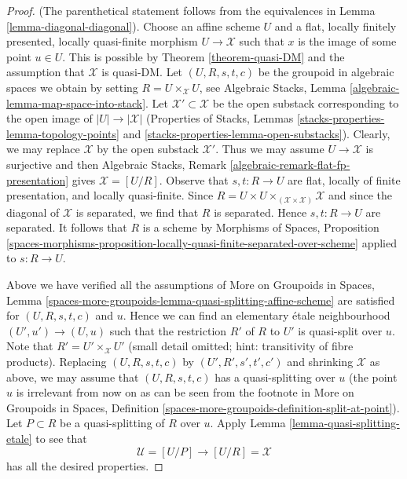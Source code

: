 \begin{proof}
(The parenthetical statement follows from the equivalences in
Lemma \ref{lemma-diagonal-diagonal}).
Choose an affine scheme $U$ and a flat, locally finitely presented,
locally quasi-finite morphism $U \to \mathcal{X}$ such that $x$
is the image of some point $u \in U$. This is possible by
Theorem \ref{theorem-quasi-DM} and the assumption that $\mathcal{X}$
is quasi-DM. Let $(U, R, s, t, c)$ be the groupoid in algebraic spaces
we obtain by setting $R = U \times_\mathcal{X} U$, see
Algebraic Stacks, Lemma \ref{algebraic-lemma-map-space-into-stack}.
Let $\mathcal{X}' \subset \mathcal{X}$ be the open substack corresponding
to the open image of $|U| \to |\mathcal{X}|$
(Properties of Stacks, Lemmas
\ref{stacks-properties-lemma-topology-points} and
\ref{stacks-properties-lemma-open-substacks}).
Clearly, we may replace $\mathcal{X}$ by the open substack $\mathcal{X}'$.
Thus we may assume $U \to \mathcal{X}$ is surjective and then
Algebraic Stacks, Remark \ref{algebraic-remark-flat-fp-presentation}
gives $\mathcal{X} = [U/R]$.
Observe that $s, t : R \to U$ are flat, locally of finite presentation,
and locally quasi-finite.
Since $R = U \times U \times_{(\mathcal{X} \times \mathcal{X})} \mathcal{X}$
and since the diagonal of $\mathcal{X}$ is separated, we find that
$R$ is separated. Hence $s, t : R \to U$ are separated. It follows
that $R$ is a scheme by
Morphisms of Spaces, Proposition
\ref{spaces-morphisms-proposition-locally-quasi-finite-separated-over-scheme}
applied to $s : R \to U$.

\medskip\noindent
Above we have verified all the assumptions of
More on Groupoids in Spaces, Lemma
\ref{spaces-more-groupoids-lemma-quasi-splitting-affine-scheme}
are satisfied for $(U, R, s, t, c)$ and $u$.
Hence we can find an elementary \'etale neighbourhood
$(U', u') \to (U, u)$ such that the restriction $R'$ of $R$ to $U'$
is quasi-split over $u$. Note that $R' = U' \times_\mathcal{X} U'$
(small detail omitted; hint: transitivity of fibre products).
Replacing $(U, R, s, t, c)$ by $(U', R', s', t', c')$ and shrinking
$\mathcal{X}$ as above, we may assume that $(U, R, s, t, c)$ has
a quasi-splitting over $u$ (the point $u$ is irrelevant from
now on as can be seen from the footnote in
More on Groupoids in Spaces, Definition
\ref{spaces-more-groupoids-definition-split-at-point}).
Let $P \subset R$ be a quasi-splitting of $R$ over $u$.
Apply Lemma \ref{lemma-quasi-splitting-etale}
to see that
$$
\mathcal{U} = [U/P] \longrightarrow [U/R] = \mathcal{X}
$$
has all the desired properties.
\end{proof}

